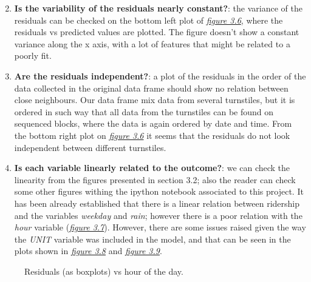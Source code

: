 \documentclass[a4paper,12pt,english]{sphinxmanual}
\begin{document}
\begin{enumerate}
\setcounter{enumi}{1}
\item {} 
\textbf{Is the variability of the residuals nearly constant?}: the variance of the
residuals can be checked on the bottom left plot of {\hyperref[section2:figure36]{\emph{figure 3.6}}},
where the residuals vs predicted values are plotted. The figure doesn't show
a constant variance along the x axis, with a lot of features that might be
related to a poorly fit.

\item {} 
\textbf{Are the residuals independent?}: a plot of the residuals in the order of the
data collected in the original data frame should show no relation between
close neighbours. Our data frame mix data from several turnstiles, but it is
ordered in such way that all data from the turnstiles can be found on sequenced
blocks, where the data is again ordered by date and time. From the bottom right
plot on {\hyperref[section2:figure36]{\emph{figure 3.6}}} it seems that the residuals do not look
independent between different turnstiles.

\item {} 
\textbf{Is each variable linearly related to the outcome?}: we can check the linearity
from the figures presented in section 3.2; also the reader can check some
other figures withing the ipython notebook associated to this project. It has
been already established that there is a linear relation between ridership and
the variables \emph{weekday} and \emph{rain}; however there is a poor relation with
the \emph{hour} variable ({\hyperref[section2:figure37]{\emph{figure 3.7}}}). However, there are some
issues raised given the way the \emph{UNIT} variable was included in the model,
and that can be seen in the plots shown in {\hyperref[section2:figure37]{\emph{figure 3.8}}}
and {\hyperref[section2:figure39]{\emph{figure 3.9}}}.

\end{enumerate}
\begin{figure}[htbp]
\centering
\capstart

\caption{Residuals (as boxplots) vs hour of the day.}\label{section2:figure37}\end{figure}
\end{document}
